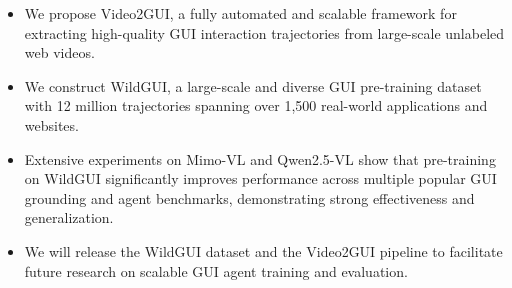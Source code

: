 \documentclass{llmxive}
\begin{document}

\begin{itemize}
    \item We propose Video2GUI, a fully automated and scalable framework for extracting high-quality GUI interaction trajectories from large-scale unlabeled web videos.
    \item We construct WildGUI, a large-scale and diverse GUI pre-training dataset with 12 million trajectories spanning over 1,500 real-world applications and websites.
    \item Extensive experiments on Mimo-VL and Qwen2.5-VL show that pre-training on WildGUI significantly improves performance across multiple popular GUI grounding and agent benchmarks, demonstrating strong effectiveness and generalization.
    \item We will release the WildGUI dataset and the Video2GUI pipeline to facilitate future research on scalable GUI agent training and evaluation.
\end{itemize}
\end{document}
